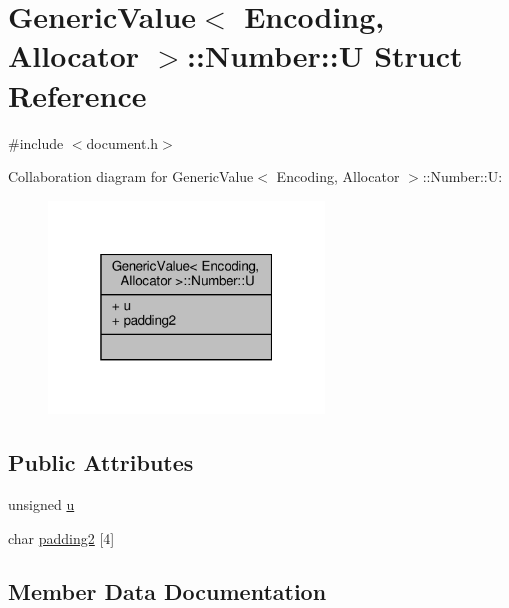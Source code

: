 \hypertarget{structGenericValue_1_1Number_1_1U}{}\section{Generic\+Value$<$ Encoding, Allocator $>$\+:\+:Number\+:\+:U Struct Reference}
\label{structGenericValue_1_1Number_1_1U}


{\ttfamily \#include $<$document.\+h$>$}



Collaboration diagram for Generic\+Value$<$ Encoding, Allocator $>$\+:\+:Number\+:\+:U\+:
\nopagebreak
\begin{figure}[H]
\begin{center}
\leavevmode
\includegraphics[width=208pt]{structGenericValue_1_1Number_1_1U__coll__graph}
\end{center}
\end{figure}
\subsection*{Public Attributes}
\begin{DoxyCompactItemize}
\item 
unsigned \hyperlink{structGenericValue_1_1Number_1_1U_a175e3a2bd43e6880791eb7c950d2f147}{u}
\item 
char \hyperlink{structGenericValue_1_1Number_1_1U_a9341f65c1645f24fd001a1ebf58d3c5b}{padding2} \mbox{[}4\mbox{]}
\end{DoxyCompactItemize}


\subsection{Member Data Documentation}
\mbox{\label{structGenericValue_1_1Number_1_1U_a9341f65c1645f24fd001a1ebf58d3c5b}} 
